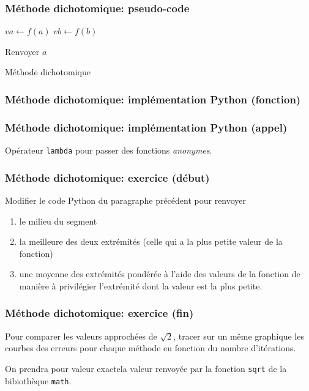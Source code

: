 \begin{frame}
  \frametitle{Méthode dichotomique: pseudo-code}
\begin{algorithm}[H]
  
  $va\leftarrow f(a)$   $vb\leftarrow f(b)$\;
  
  Renvoyer $a$\;
  \caption{Méthode dichotomique}
  \label{resolnumequ_1}
\end{algorithm}
\end{frame}

\begin{frame}
  \frametitle{Méthode dichotomique: implémentation Python (fonction) }

\end{frame}

\begin{frame}
  \frametitle{Méthode dichotomique: implémentation Python (appel) }

Opérateur \texttt{lambda} pour passer des fonctions \emph{anonymes}.


\end{frame}

\begin{frame}
  \frametitle{Méthode dichotomique: exercice (début)}
Modifier le code Python du paragraphe précédent pour renvoyer
\begin{enumerate}
  \item le milieu du segment
  \item la meilleure des deux extrémités (celle qui a la plus petite valeur de la fonction)
  \item une moyenne des extrémités pondérée à l'aide des valeurs de la fonction de manière à privilégier l'extrémité dont la valeur est la plus petite.
\end{enumerate}
\end{frame}

\begin{frame}[fragile]
  \frametitle{Méthode dichotomique: exercice (fin)}

Pour comparer les valeurs approchées de $\sqrt{2}$, tracer sur un même graphique les courbes des erreurs pour chaque méthode en fonction du nombre d'itérations.

On prendra pour valeur \og exacte\fg la valeur renvoyée par la fonction \texttt{sqrt} de la bibiothèque \texttt{math}.
\end{frame}

